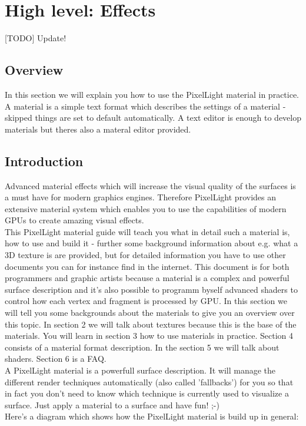 \chapter{High level: Effects}


[TODO] Update!


\section{Overview}
In this section we will explain you how to use the PixelLight material in practice. A material 
is a simple text format which describes the settings of a material - skipped things are set to
default automatically. A text editor is enough to develop materials but theres also a materal
editor provided.



\section{Introduction}
Advanced material effects which will increase the visual quality of the surfaces is a must have
for modern graphics engines. Therefore PixelLight provides an extensive material system which enables you
to use the capabilities of modern \ac{GPU}s to create amazing visual effects.\\

This PixelLight material guide will teach you what in detail such a material is, how to use and
build it - further some background information about e.g. what a 3D texture is are provided, but for
detailed information you have to use other documents you can for instance find in the internet. This document
is for both programmers and graphic artists because a material is a complex
and powerful surface description and it's also possible to programm byself advanced shaders to
control how each vertex and fragment is processed by \ac{GPU}. In this section we will tell you some
backgrounds about the materials to give you an overview over this topic. In section 2 we will talk
about textures because this is the base of the materials. You will learn in section 3 how to use
materials in practice. Section 4 consists of a material format description. In the section
5 we will talk about shaders. Section 6 is a \ac{FAQ}.\\

A PixelLight material is a powerfull surface description. It will manage the different render techniques
automatically (also called 'fallbacks') for you so that in fact you don't need to know which technique is
currently used to visualize a surface. Just apply a material to a surface and have fun! ;-)\\
Here's a diagram which shows how the PixelLight material is build up in general:\\

